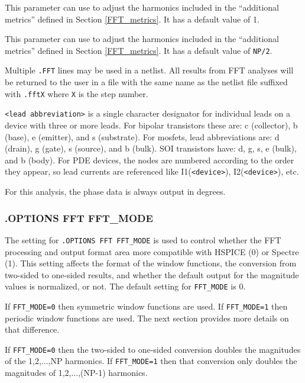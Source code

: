 \begin{Command}
\begin {Arguments}
This parameter can use to adjust the harmonics included in the
``additional metrics'' defined in Section \ref{FFT_metrics}.  It
has a default value of 1.

This parameter can use to adjust the harmonics included in the
``additional metrics'' defined in Section \ref{FFT_metrics}.  It
has a default value of \texttt{NP/2}.

\end{Arguments}

\comments
Multiple \texttt{.FFT} lines may be used in a netlist.  All results from FFT analyses
will be returned to the user in a file with the same name as the netlist file suffixed
with \texttt{.fftX} where {\tt X} is the step number.

\texttt{<lead abbreviation>} is a single character designator for individual
leads on a device with three or more leads.  For bipolar transistors these are:
c (collector), b (base), e (emitter), and s (substrate).  For mosfets, lead
abbreviations are: d (drain), g (gate), s (source), and b (bulk).  SOI
transistors have: d, g, s, e (bulk), and b (body).  For PDE devices, the nodes
are numbered according to the order they appear, so lead currents are
referenced like I1(\texttt{<device>}), I2(\texttt{<device>}), etc.

For this analysis, the phase data is always output in degrees.

\end{Command}

\subsubsection{.OPTIONS FFT FFT\_MODE}
\label{FFT_MODE}
The setting for \texttt{.OPTIONS FFT FFT\_MODE} is used to control whether the
\Xyce{} FFT processing and output format area more compatible with HSPICE (0) or
Spectre (1).  This setting affects the format of the window functions, the
conversion from two-sided to one-sided results, and whether the default output
for the magnitude values is normalized, or not.  The default setting for
\texttt{FFT\_MODE} is 0.

If \texttt{FFT\_MODE=0} then symmetric window functions are used.  If
\texttt{FFT\_MODE=1} then periodic window functions are used.  The next
section provides more details on that difference.

If \texttt{FFT\_MODE=0} then the two-sided to one-sided conversion doubles
the magnitudes of the 1,2,...,NP harmonics. If \texttt{FFT\_MODE=1} then that
conversion only doubles the magnitudes of 1,2,...,(NP-1) harmonics.

